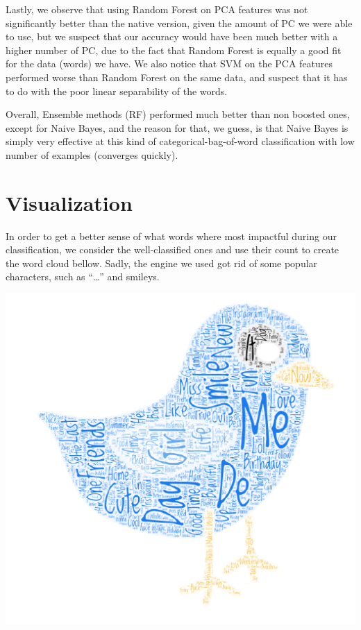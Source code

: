 \documentclass[11pt,twocolumn]{report}
\begin{document}
    \par
    Lastly, we observe that using Random Forest on PCA features was not significantly better than the native version, given the amount of PC we were able to use, but we suspect that our accuracy would have been much better with a higher number of PC, due to the fact that Random Forest is equally a good fit for the data (words) we have. We also notice that SVM on the PCA features performed worse than Random Forest on the same data, and suspect that it has to do with the poor linear separability of the words.
    \par
    Overall, Ensemble methods (RF) performed much better than non boosted ones, except for Naive Bayes, and the reason for that, we guess, is that Naive Bayes is simply very effective at this kind of categorical-bag-of-word classification with low number of examples (converges quickly). 

\section*{Visualization}
    In order to get a better sense of what words where most impactful during our classification, we consider the well-classified ones and use their count to create the word cloud bellow. Sadly, the engine we used got rid of some popular characters, such as ``\ldots'' and smileys.
    
    \begin{center}
        \includegraphics[scale=0.45]{cloud}
    \end{center}



\end{document}
